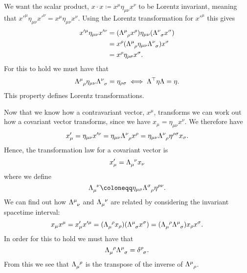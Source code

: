 We want the scalar product, \(x \cdot x \coloneqq x^\mu \eta_{\mu\nu} x^\nu\) to be Lorentz invariant, meaning that \(x'^\mu \eta_{\mu\nu} x'^\nu = x^\mu \eta_{\mu\nu} x^\nu\).
Using the Lorentz transformation for \(x'^\mu\) this gives
\begin{align}
    x'^\mu\eta_{\mu\nu}x'^\nu &= (\tensor{\Lambda}{^\mu_\rho}x^\rho)\eta_{\mu\nu}(\tensor{\Lambda}{^\nu_\sigma}x^\sigma)\\
    &= x^\rho(\tensor{\Lambda}{^\mu_\rho}\eta_{\mu\nu}\tensor{\Lambda}{^\nu_\sigma})x^\sigma\\
    &= x^\rho\eta_{\rho\sigma}x^\sigma.
\end{align}
For this to hold we must have that
\begin{equation}
    \tensor{\Lambda}{^\mu_\rho} \eta_{\mu\nu} \tensor{\Lambda}{^\nu_\sigma} = \eta_{\rho\sigma} \iff \Lambda^\trans \eta \Lambda = \eta.
\end{equation}
This property defines Lorentz transformations.

Now that we know how a contravariant vector, \(x^\mu\), transforms we can work out how a covariant vector transforms, since we have \(x_\mu = \eta_{\mu\nu}x^\nu\).
We therefore have
\begin{equation}
    x'_\mu = \eta_{\mu\nu}x'^\nu = \eta_{\mu\nu}\tensor{\Lambda}{^\nu_\rho}x^\rho = \eta_{\mu\nu}\tensor{\Lambda}{^\nu_\rho} \eta^{\rho\sigma}x_\sigma.
\end{equation}
Hence, the transformation law for a covariant vector is
\begin{equation}
    x'_\mu = \tensor{\Lambda}{_\mu^\nu}x_\nu
\end{equation}
where we define
\begin{equation}
    \tensor{\Lambda}{_\mu^\nu} \coloneqq \eta_{\mu\sigma}\tensor{\Lambda}{^\sigma_\rho}\eta^{\rho\nu}.
\end{equation}
We can find out how \(\tensor{\Lambda}{^\mu_\nu}\) and \(\tensor{\Lambda}{_\mu^\nu}\) are related by considering the invariant spacetime interval:
\begin{equation}
    x_\mu x^\mu = x'_\mu x'^\mu = (\tensor{\Lambda}{_\mu^\rho} x_\rho)(\tensor{\Lambda}{^\mu_\sigma}x^\sigma) = (\tensor{\Lambda}{_\mu^\rho}\tensor{\Lambda}{^\mu_\sigma}) x_\rho x^\sigma.
\end{equation}
In order for this to hold we must have that
\begin{equation}
    \tensor{\Lambda}{_\mu^\rho}\tensor{\Lambda}{^\mu_\sigma} = \tensor{\delta}{^\rho_\sigma}.
\end{equation}
From this we see that \(\tensor{\Lambda}{_\mu^\rho}\) is the transpose of the inverse of \(\tensor{\Lambda}{^\mu_\rho}\).

